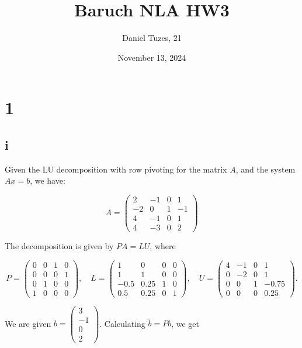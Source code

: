 \documentclass{article}
\title{Baruch NLA HW3}
\author{Daniel Tuzes, 21}
\date{November 13, 2024}
\begin{document}
\maketitle

\section*{1}
\subsection*{i}



Given the LU decomposition with row pivoting for the matrix \(A\), and the system \(Ax = b\), we have:

\[
    A = \begin{pmatrix}
        2  & -1 & 0 & 1  \\
        -2 & 0  & 1 & -1 \\
        4  & -1 & 0 & 1  \\
        4  & -3 & 0 & 2
    \end{pmatrix}
\]

The decomposition is given by \( PA = LU \), where

\[
    P = \begin{pmatrix}
        0 & 0 & 1 & 0 \\
        0 & 0 & 0 & 1 \\
        0 & 1 & 0 & 0 \\
        1 & 0 & 0 & 0
    \end{pmatrix}, \quad
    L = \begin{pmatrix}
        1    & 0    & 0 & 0 \\
        1    & 1    & 0 & 0 \\
        -0.5 & 0.25 & 1 & 0 \\
        0.5  & 0.25 & 0 & 1
    \end{pmatrix}, \quad
    U = \begin{pmatrix}
        4 & -1 & 0 & 1     \\
        0 & -2 & 0 & 1     \\
        0 & 0  & 1 & -0.75 \\
        0 & 0  & 0 & 0.25
    \end{pmatrix}.
\]

We are given \( b = \begin{pmatrix} 3 \\ -1 \\ 0 \\ 2 \end{pmatrix} \). Calculating \( \tilde{b} = Pb \), we get
\end{document}
